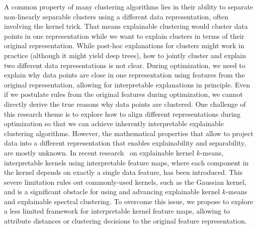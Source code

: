 \documentclass[a4paper,11pt]{article}
\begin{document}
A common property of many clustering algorithms lies in their ability to separate non-linearly separable clusters using a different data representation, often involving the kernel trick.
That means explainable clustering would cluster data points in one representation while we want to explain clusters in terms of their original representation.
While post-hoc explanations for clusters might work in practice (although it might yield deep trees),
how to jointly cluster and explain two different data representations is not clear.
During optimization, we need to explain why data points are close in one representation using features from the original representation, 
allowing for interpretable explanations in principle.
Even if we postulate rules from the original features during optimization, we cannot directly derive the true reasons why data points are clustered.  
One challenge of this research theme is to explore how to align different representations during optimization so that we can achieve inherently interpretable explainable clustering algorithms.
However, the mathematical properties that allow to project data into a different representation that enables explainability and separability, are mostly unknown.
In recent research~\cite{fleissner2024explaining} on explainable kernel $k$-means, interpretable kernels using interpretable feature maps, where each component in the kernel depends on exactly a single data feature, has been introduced.  
This severe limitation rules out commonly-used kernels, such as the Gaussian kernel, and is a significant obstacle for using and advancing explainable kernel $k$-means and explainable spectral clustering.
To overcome this issue, we propose to explore a less limited framework for interpretable kernel feature maps, allowing to attribute distances or clustering decisions to the original feature representation. 



\iffalse
\end{document}

